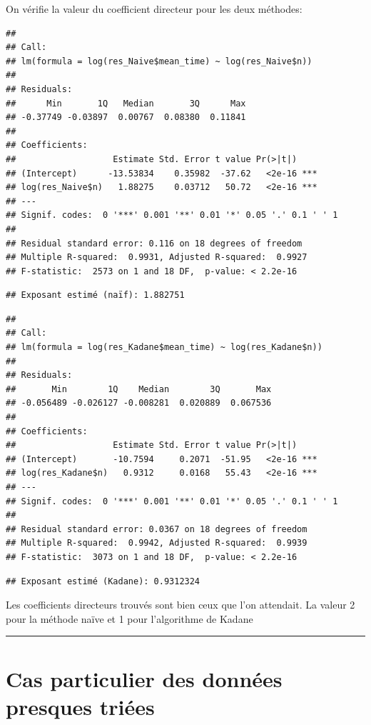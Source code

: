 \documentclass[
]{article}
\begin{document}
On vérifie la valeur du coefficient directeur pour les deux méthodes:

\begin{verbatim}
## 
## Call:
## lm(formula = log(res_Naive$mean_time) ~ log(res_Naive$n))
## 
## Residuals:
##      Min       1Q   Median       3Q      Max 
## -0.37749 -0.03897  0.00767  0.08380  0.11841 
## 
## Coefficients:
##                   Estimate Std. Error t value Pr(>|t|)    
## (Intercept)      -13.53834    0.35982  -37.62   <2e-16 ***
## log(res_Naive$n)   1.88275    0.03712   50.72   <2e-16 ***
## ---
## Signif. codes:  0 '***' 0.001 '**' 0.01 '*' 0.05 '.' 0.1 ' ' 1
## 
## Residual standard error: 0.116 on 18 degrees of freedom
## Multiple R-squared:  0.9931, Adjusted R-squared:  0.9927 
## F-statistic:  2573 on 1 and 18 DF,  p-value: < 2.2e-16
\end{verbatim}

\begin{verbatim}
## Exposant estimé (naïf): 1.882751
\end{verbatim}

\begin{verbatim}
## 
## Call:
## lm(formula = log(res_Kadane$mean_time) ~ log(res_Kadane$n))
## 
## Residuals:
##       Min        1Q    Median        3Q       Max 
## -0.056489 -0.026127 -0.008281  0.020889  0.067536 
## 
## Coefficients:
##                   Estimate Std. Error t value Pr(>|t|)    
## (Intercept)       -10.7594     0.2071  -51.95   <2e-16 ***
## log(res_Kadane$n)   0.9312     0.0168   55.43   <2e-16 ***
## ---
## Signif. codes:  0 '***' 0.001 '**' 0.01 '*' 0.05 '.' 0.1 ' ' 1
## 
## Residual standard error: 0.0367 on 18 degrees of freedom
## Multiple R-squared:  0.9942, Adjusted R-squared:  0.9939 
## F-statistic:  3073 on 1 and 18 DF,  p-value: < 2.2e-16
\end{verbatim}

\begin{verbatim}
## Exposant estimé (Kadane): 0.9312324
\end{verbatim}

Les coefficients directeurs trouvés sont bien ceux que l'on attendait.
La valeur 2 pour la méthode naïve et 1 pour l'algorithme de Kadane

\begin{center}\rule{0.5\linewidth}{0.5pt}\end{center}

\section{Cas particulier des données presques
triées}\label{cas-particulier-des-donnuxe9es-presques-triuxe9es}
\end{document}
